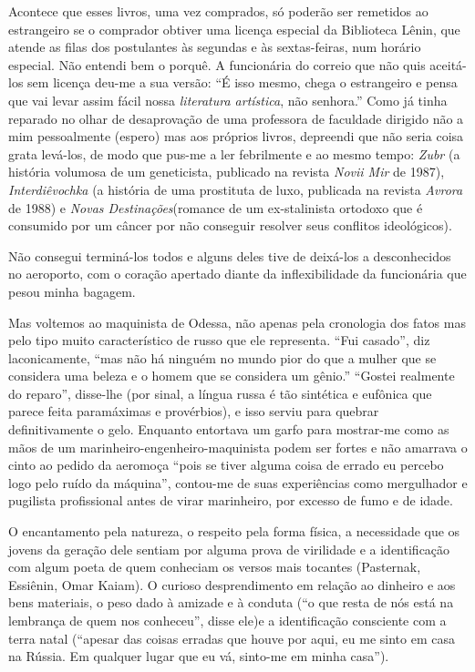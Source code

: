 Acontece que esses livros, uma vez comprados, só poderão ser remetidos
ao estrangeiro se o comprador obtiver uma licença especial da Biblioteca
Lênin, que atende as filas dos postulantes às segundas e às
sextas-feiras, num horário especial. Não entendi bem o porquê. A
funcionária do correio que não quis aceitá-los sem licença deu-me a sua
versão: ``É isso mesmo, chega o estrangeiro e pensa que vai levar assim
fácil nossa \emph{literatura artística}, não senhora.'' Como já tinha
reparado no olhar de desaprovação de uma professora de faculdade
dirigido não a mim pessoalmente (espero) mas aos próprios livros,
depreendi que não seria coisa grata levá-los, de modo que pus-me a ler
febrilmente e ao mesmo tempo: \emph{Zubr} (a história volumosa de um
geneticista, publicado na revista \emph{Novii Mir} de 1987),
\emph{Interdiêvochka} (a história de uma prostituta de luxo, publicada
na revista \emph{Avrora} de 1988) e \emph{Novas Destinações}(romance de
um ex-stalinista ortodoxo que é consumido por um câncer por não
conseguir resolver seus conflitos ideológicos).

Não consegui terminá-los todos e alguns deles tive de deixá-los a
desconhecidos no aeroporto, com o coração apertado diante da
inflexibilidade da funcionária que pesou minha bagagem.

Mas voltemos ao maquinista de Odessa, não apenas pela cronologia dos
fatos mas pelo tipo muito característico de russo que ele representa.
``Fui casado'', diz laconicamente, ``mas não há ninguém no mundo pior do
que a mulher que se considera uma beleza e o homem que se considera um
gênio.'' ``Gostei realmente do reparo'', disse-lhe (por sinal, a língua
russa é tão sintética e eufônica que parece feita paramáximas e
provérbios), e isso serviu para quebrar definitivamente o gelo. Enquanto
entortava um garfo para mostrar-me como as mãos de um
marinheiro-engenheiro-maquinista podem ser fortes e não amarrava o cinto
ao pedido da aeromoça ``pois se tiver alguma coisa de errado eu percebo
logo pelo ruído da máquina'', contou-me de suas experiências como
mergulhador e pugilista profissional antes de virar marinheiro, por
excesso de fumo e de idade.

O encantamento pela natureza, o respeito pela forma física, a
necessidade que os jovens da geração dele sentiam por alguma prova de
virilidade e a identificação com algum poeta de quem conheciam os versos
mais tocantes (Pasternak, Essiênin, Omar Kaiam). O curioso
desprendimento em relação ao dinheiro e aos bens materiais, o peso dado
à amizade e à conduta (``o que resta de nós está na lembrança de quem
nos conheceu'', disse ele)e a identificação consciente com a terra natal
(``apesar das coisas erradas que houve por aqui, eu me sinto em casa na
Rússia. Em qualquer lugar que eu vá, sinto-me em minha casa'').

